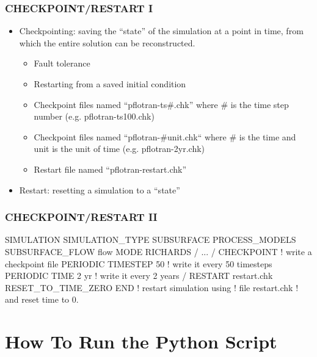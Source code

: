 \documentclass{beamer}
\newcommand\redcomment[1]{{{\color{red} #1}}}
\newcommand\bluecomment[1]{{{\color{blue} #1}}}
\begin{document}
\begin{frame}[fragile]\frametitle{CHECKPOINT/RESTART I}

\begin{itemize}
\item Checkpointing: saving the ``state'' of the simulation at a point in time, from which the entire solution can be reconstructed.
  \begin{itemize}
    \item Fault tolerance
    \item Restarting from a saved initial condition
    \item Checkpoint files named ``pflotran-ts\#.chk'' where \# is the time step number (e.g. pflotran-ts100.chk)
    \item Checkpoint files named ``pflotran-\#unit.chk`` where \# is the time and unit is the unit of time (e.g. pflotran-2yr.chk)
    \item Restart file named ``pflotran-restart.chk''
  \end{itemize}
\item Restart: resetting a simulation to a ``state''
\end{itemize}

\end{frame}

\begin{frame}[fragile]\frametitle{CHECKPOINT/RESTART II}

\begin{semiverbatim}

SIMULATION
  SIMULATION_TYPE SUBSURFACE
  PROCESS_MODELS
    SUBSURFACE_FLOW flow
      MODE RICHARDS
    /
    ...
  /
  CHECKPOINT               \bluecomment{! write a checkpoint file}
    PERIODIC TIMESTEP 50   \bluecomment{! write it every 50 timesteps}
    PERIODIC TIME 2 yr     \bluecomment{! write it every 2 years}
  /
  RESTART restart.chk \redcomment{RESET_TO_TIME_ZERO}  
END                        \bluecomment{! restart simulation using}
                           \bluecomment{! file \redcomment{restart.chk}}
                           \bluecomment{! and reset time to 0.}

\end{semiverbatim}

\end{frame}


\section{How To Run the Python Script}
\end{document}
